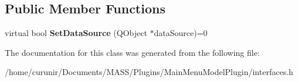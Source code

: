 \subsection*{Public Member Functions}
\begin{DoxyCompactItemize}
\item 
virtual bool {\bfseries Set\+Data\+Source} (Q\+Object $\ast$data\+Source)=0\hypertarget{class_i_data_manager_plugin_ad9a6a153bc6fe2c64b0a4ee2013fb149}{}\label{class_i_data_manager_plugin_ad9a6a153bc6fe2c64b0a4ee2013fb149}

\end{DoxyCompactItemize}


The documentation for this class was generated from the following file\+:\begin{DoxyCompactItemize}
\item 
/home/curunir/\+Documents/\+M\+A\+S\+S/\+Plugins/\+Main\+Menu\+Model\+Plugin/interfaces.\+h\end{DoxyCompactItemize}
